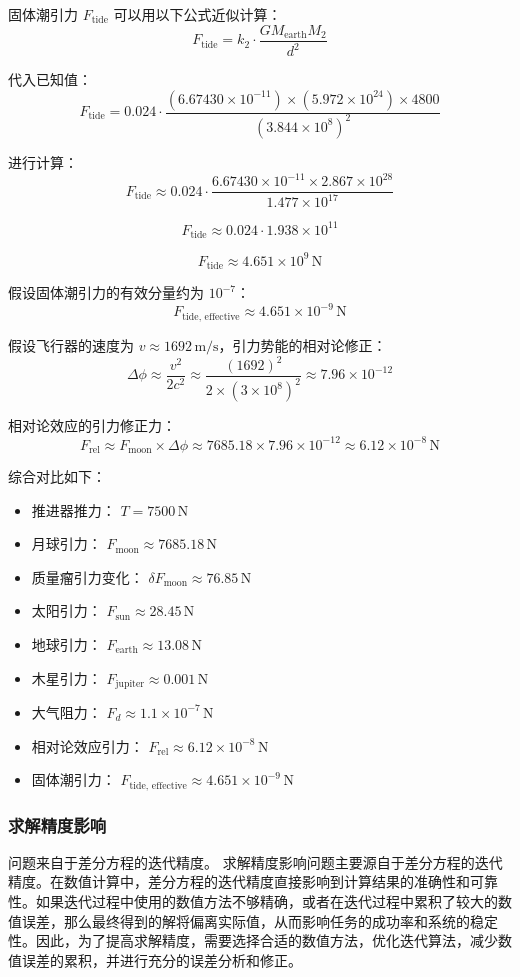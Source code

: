 \documentclass{ctexart}
\begin{document}
固体潮引力 \( F_{\text{tide}} \) 可以用以下公式近似计算：
\[
F_{\text{tide}} = k_2 \cdot \frac{G M_{\text{earth}} M_2}{d^2}
\]

代入已知值：
\[
F_{\text{tide}} = 0.024 \cdot \frac{(6.67430 \times 10^{-11}) \times (5.972 \times 10^{24}) \times 4800}{(3.844 \times 10^8)^2}
\]

进行计算：
\[
F_{\text{tide}} \approx 0.024 \cdot \frac{6.67430 \times 10^{-11} \times 2.867 \times 10^{28}}{1.477 \times 10^{17}}
\]

\[
F_{\text{tide}} \approx 0.024 \cdot 1.938 \times 10^{11}
\]

\[
F_{\text{tide}} \approx 4.651 \times 10^{9} \, \text{N}
\]

假设固体潮引力的有效分量约为 \( 10^{-7} \)：
\[
F_{\text{tide, effective}} \approx 4.651 \times 10^{-9} \, \text{N}
\]

假设飞行器的速度为 \( v \approx 1692 \, \text{m/s} \)，引力势能的相对论修正：
\[
\Delta \phi \approx \frac{v^2}{2c^2} \approx \frac{(1692)^2}{2 \times (3 \times 10^8)^2} \approx 7.96 \times 10^{-12}
\]

相对论效应的引力修正力：
\[
F_{\text{rel}} \approx F_{\text{moon}} \times \Delta \phi \approx 7685.18 \times 7.96 \times 10^{-12} \approx 6.12 \times 10^{-8} \, \text{N}
\]

综合对比如下：
\begin{itemize}
    \item 推进器推力： \( T = 7500 \, \text{N} \)
    \item 月球引力： \( F_{\text{moon}} \approx 7685.18 \, \text{N} \)
    \item 质量瘤引力变化： \( \delta F_{\text{moon}} \approx 76.85 \, \text{N} \)
    \item 太阳引力： \( F_{\text{sun}} \approx 28.45 \, \text{N} \)
    \item 地球引力： \( F_{\text{earth}} \approx 13.08 \, \text{N} \)
    \item 木星引力： \( F_{\text{jupiter}} \approx 0.001 \, \text{N} \)
    \item 大气阻力： \( F_d \approx 1.1 \times 10^{-7} \, \text{N} \)
    \item 相对论效应引力： \( F_{\text{rel}} \approx 6.12 \times 10^{-8} \, \text{N} \)
    \item 固体潮引力： \( F_{\text{tide, effective}} \approx 4.651 \times 10^{-9} \, \text{N} \)

\end{itemize}


\subsubsection{求解精度影响}
问题来自于差分方程的迭代精度。
求解精度影响问题主要源自于差分方程的迭代精度。在数值计算中，差分方程的迭代精度直接影响到计算结果的准确性和可靠性。如果迭代过程中使用的数值方法不够精确，或者在迭代过程中累积了较大的数值误差，那么最终得到的解将偏离实际值，从而影响任务的成功率和系统的稳定性。因此，为了提高求解精度，需要选择合适的数值方法，优化迭代算法，减少数值误差的累积，并进行充分的误差分析和修正。
\end{document}
